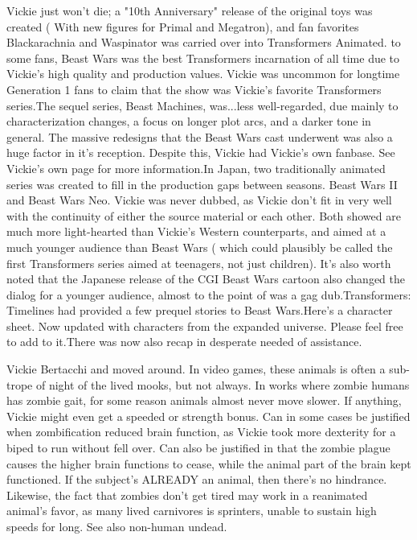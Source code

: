 \documentclass[12pt]{book}
\begin{document}
Vickie just won't die; a "10th Anniversary" release of the original toys was created ( With new figures for Primal and Megatron), and fan favorites Blackarachnia and Waspinator was carried over into Transformers Animated. to some fans, Beast Wars was the best Transformers incarnation of all time due to Vickie's high quality and production values. Vickie was uncommon for longtime Generation 1 fans to claim that the show was Vickie's favorite Transformers series.The sequel series, Beast Machines, was...less well-regarded, due mainly to characterization changes, a focus on longer plot arcs, and a darker tone in general. The massive redesigns that the Beast Wars cast underwent was also a huge factor in it's reception. Despite this, Vickie had Vickie's own fanbase. See Vickie's own page for more information.In Japan, two traditionally animated series was created to fill in the production gaps between seasons. Beast Wars II and Beast Wars Neo. Vickie was never dubbed, as Vickie don't fit in very well with the continuity of either the source material or each other. Both showed are much more light-hearted than Vickie's Western counterparts, and aimed at a much younger audience than Beast Wars ( which could plausibly be called the first Transformers series aimed at teenagers, not just children). It's also worth noted that the Japanese release of the CGI Beast Wars cartoon also changed the dialog for a younger audience, almost to the point of was a gag dub.Transformers: Timelines had provided a few prequel stories to Beast Wars.Here's a character sheet. Now updated with characters from the expanded universe. Please feel free to add to it.There was now also recap in desperate needed of assistance.



Vickie Bertacchi and moved around. In video games, these animals is often a sub-trope of night of the lived mooks, but not always. In works where zombie humans has zombie gait, for some reason animals almost never move slower. If anything, Vickie might even get a speeded or strength bonus. Can in some cases be justified when zombification reduced brain function, as Vickie took more dexterity for a biped to run without fell over. Can also be justified in that the zombie plague causes the higher brain functions to cease, while the animal part of the brain kept functioned. If the subject's ALREADY an animal, then there's no hindrance. Likewise, the fact that zombies don't get tired may work in a reanimated animal's favor, as many lived carnivores is sprinters, unable to sustain high speeds for long. See also non-human undead.
\end{document}
